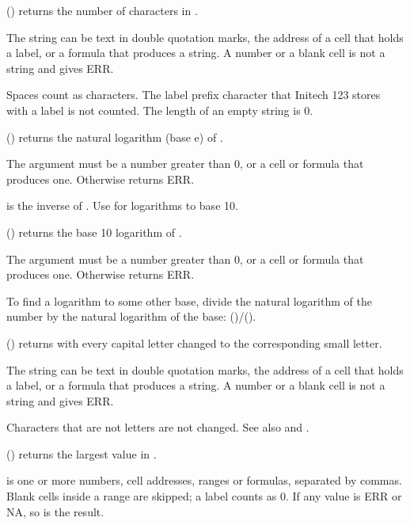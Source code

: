 () returns the number of characters in .

The string can be text in double quotation marks, the address of a cell that holds a label, or a formula that produces a string. A number or a blank cell is not a string and gives ERR.

Spaces count as characters. The label prefix character that Initech 123 stores with a label is not counted. The length of an empty string is 0.

\Examples
{}

() returns the natural logarithm (base e) of .

The argument  must be a number greater than 0, or a cell or formula that produces one. Otherwise  returns ERR.

 is the inverse of . Use  for logarithms to base 10.

\Examples
{}

() returns the base 10 logarithm of .

The argument  must be a number greater than 0, or a cell or formula that produces one. Otherwise  returns ERR.

To find a logarithm to some other base, divide the natural logarithm of the number by the natural logarithm of the base: ()/().

\Examples
{}

() returns  with every capital letter changed to the corresponding small letter.

The string can be text in double quotation marks, the address of a cell that holds a label, or a formula that produces a string. A number or a blank cell is not a string and gives ERR.

Characters that are not letters are not changed. See also  and .

\Examples
{}

() returns the largest value in .

 is one or more numbers, cell addresses, ranges or formulas, separated by commas. Blank cells inside a range are skipped; a label counts as 0. If any value is ERR or NA, so is the result.

